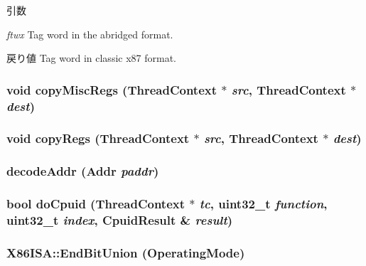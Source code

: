 \begin{DoxyParams}{引数}
\item[{\em ftwx}]Tag word in the abridged format. \end{DoxyParams}
\begin{DoxyReturn}{戻り値}
Tag word in classic x87 format. 
\end{DoxyReturn}
\hypertarget{namespaceX86ISA_a42833096094e5ff0f2de948bf8e5965c}{
\subsubsection[{copyMiscRegs}]{\setlength{\rightskip}{0pt plus 5cm}void copyMiscRegs ({\bf ThreadContext} $\ast$ {\em src}, \/  {\bf ThreadContext} $\ast$ {\em dest})}}
\label{namespaceX86ISA_a42833096094e5ff0f2de948bf8e5965c}
\hypertarget{namespaceX86ISA_aaeffcccf262b0dbd3cbcc8b4cef41168}{
\subsubsection[{copyRegs}]{\setlength{\rightskip}{0pt plus 5cm}void copyRegs ({\bf ThreadContext} $\ast$ {\em src}, \/  {\bf ThreadContext} $\ast$ {\em dest})}}
\label{namespaceX86ISA_aaeffcccf262b0dbd3cbcc8b4cef41168}
\hypertarget{namespaceX86ISA_adb790daea6d2a4198290c636a655fbc7}{
\subsubsection[{decodeAddr}]{ decodeAddr ({\bf Addr} {\em paddr})}}
\label{namespaceX86ISA_adb790daea6d2a4198290c636a655fbc7}
\hypertarget{namespaceX86ISA_a1cf7354b42b56aa483040caaa06d7be4}{
\subsubsection[{doCpuid}]{\setlength{\rightskip}{0pt plus 5cm}bool doCpuid ({\bf ThreadContext} $\ast$ {\em tc}, \/  {\bf uint32\_\-t} {\em function}, \/  {\bf uint32\_\-t} {\em index}, \/  CpuidResult \& {\em result})}}
\label{namespaceX86ISA_a1cf7354b42b56aa483040caaa06d7be4}
\hypertarget{namespaceX86ISA_adc02755269202e7fd36d177fb540c2d2}{
\subsubsection[{EndBitUnion}]{\setlength{\rightskip}{0pt plus 5cm}X86ISA::EndBitUnion (OperatingMode)}}
\label{namespaceX86ISA_adc02755269202e7fd36d177fb540c2d2}



